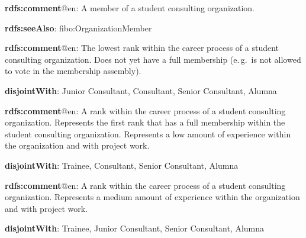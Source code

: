 \documentclass[a4paper, DIV=13, BCOR=0cm]{scrbook}
\newcommand{\eg}{e.\,g.\ }
\begin{document}
\begin{mdframed}[style=onto-2, frametitle={Member}]
	{%
		\begin{compactitem}
			\item \textbf{rdfs:comment}@en: A member of a student consulting organization.
			\item \textbf{rdfs:seeAlso}: fibo:OrganizationMember
		\end{compactitem}
	} %
\end{mdframed}

\begin{mdframed}[style=onto-3, frametitle={Trainee}]
	{%
		\begin{compactitem}
			\item \textbf{rdfs:comment}@en: The lowest rank within the career 
			process of a student consulting organization. Does not yet have a 
			full membership (\eg is not allowed to vote in the membership 
			assembly).
			\item \textbf{disjointWith}: Junior Consultant, Consultant, Senior 
			Consultant, Alumna
		\end{compactitem}
	} %
\end{mdframed}

\begin{mdframed}[style=onto-3, frametitle={Junior Consultant}]
	{%
		\begin{compactitem}
			\item \textbf{rdfs:comment}@en: A rank within the career process of 
			a student consulting organization. Represents the first rank that has a 
			full membership within the student consulting organization. 
			Represents a low amount of experience within the organization and 
			with project work.
			\item \textbf{disjointWith}: Trainee, Consultant, Senior Consultant, 
			Alumna
		\end{compactitem}
	} %
\end{mdframed}

\begin{mdframed}[style=onto-3, frametitle={Consultant}]
	{%
		\begin{compactitem}
			\item \textbf{rdfs:comment}@en: A rank within the career process of 
			a student consulting organization. Represents a medium amount of 
			experience within the organization and with project work.
			\item \textbf{disjointWith}: Trainee, Junior Consultant, Senior 
			Consultant, Alumna
		\end{compactitem}
	} %
\end{mdframed}
\end{document}

